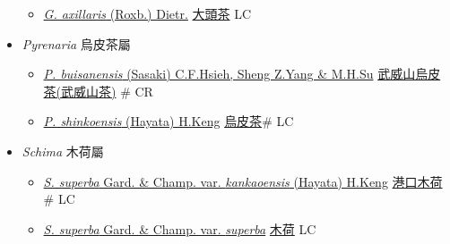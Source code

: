 \begin{itemize}
  \begin{itemize}
        \item[] \href{http://www.theplantlist.org/tpl1.1/search?q=Gordonia+axillaris}{\textit{G. axillaris} (Roxb.) Dietr.}   \href{\detokenize{http://taibnet.sinica.edu.tw/chi/taibnet_species_list.php?T2=大頭茶&T2_new_value=true&fr=y}}{大頭茶} LC
  \end{itemize}
 \item[] \textit{Pyrenaria} 烏皮茶屬
                    
  \begin{itemize}
        \item[] \href{http://www.theplantlist.org/tpl1.1/search?q=Pyrenaria+buisanensis}{\textit{P. buisanensis} (Sasaki) C.F.Hsieh, Sheng Z.Yang \& M.H.Su}     \href{\detokenize{http://taibnet.sinica.edu.tw/chi/taibnet_species_list.php?T2=武威山烏皮茶&T2_new_value=true&fr=y}}{武威山烏皮茶(武威山茶)}  \# CR
        \item[] \href{http://www.theplantlist.org/tpl1.1/search?q=Pyrenaria+shinkoensis}{\textit{P. shinkoensis} (Hayata) H.Keng}   \href{\detokenize{http://taibnet.sinica.edu.tw/chi/taibnet_species_list.php?T2=烏皮茶&T2_new_value=true&fr=y}}{烏皮茶}\# LC
  \end{itemize}
 \item[] \textit{Schima} 木荷屬
                    
  \begin{itemize}
        \item[] \href{http://www.theplantlist.org/tpl1.1/search?q=Schima+superba+var.+kankaoensis}{\textit{S. superba} Gard. \& Champ. var. \textit{kankaoensis} (Hayata) H.Keng}   \href{\detokenize{http://taibnet.sinica.edu.tw/chi/taibnet_species_list.php?T2=港口木荷&T2_new_value=true&fr=y}}{港口木荷}\# LC
        \item[] \href{http://www.theplantlist.org/tpl1.1/search?q=Schima+superba+var.+superba}{\textit{S. superba} Gard. \& Champ. var. \textit{superba}}   \href{\detokenize{http://taibnet.sinica.edu.tw/chi/taibnet_species_list.php?T2=木荷&T2_new_value=true&fr=y}}{木荷} LC
  \end{itemize}
  \end{itemize}

